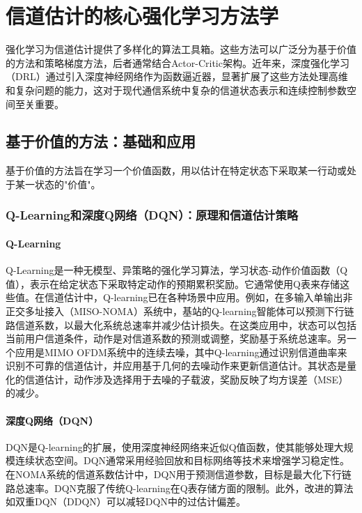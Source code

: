 \documentclass[journal]{IEEEtran}
\begin{document}
\section{信道估计的核心强化学习方法学}

强化学习为信道估计提供了多样化的算法工具箱。这些方法可以广泛分为基于价值的方法和策略梯度方法，后者通常结合Actor-Critic架构。近年来，深度强化学习（DRL）通过引入深度神经网络作为函数逼近器，显著扩展了这些方法处理高维和复杂问题的能力，这对于现代通信系统中复杂的信道状态表示和连续控制参数空间至关重要\cite{ref8}。

\subsection{基于价值的方法：基础和应用}

基于价值的方法旨在学习一个价值函数，用以估计在特定状态下采取某一行动或处于某一状态的"价值"。

\subsubsection{Q-Learning和深度Q网络（DQN）：原理和信道估计策略}

\paragraph{Q-Learning}
Q-Learning是一种无模型、异策略的强化学习算法，学习状态-动作价值函数（Q值），表示在给定状态下采取特定动作的预期累积奖励\cite{ref7}。它通常使用Q表来存储这些值。在信道估计中，Q-learning已在各种场景中应用。例如，在多输入单输出非正交多址接入（MISO-NOMA）系统中，基站的Q-learning智能体可以预测下行链路信道系数，以最大化系统总速率并减少估计损失\cite{ref15}。在这类应用中，状态可以包括当前用户信道条件，动作是对信道系数的预测或调整，奖励基于系统总速率\cite{ref15}。另一个应用是MIMO OFDM系统中的连续去噪，其中Q-learning通过识别信道曲率来识别不可靠的信道估计，并应用基于几何的去噪动作来更新信道估计。其状态是量化的信道估计，动作涉及选择用于去噪的子载波，奖励反映了均方误差（MSE）的减少\cite{ref17}。

\paragraph{深度Q网络（DQN）}
DQN是Q-learning的扩展，使用深度神经网络来近似Q值函数，使其能够处理大规模连续状态空间\cite{ref7}。DQN通常采用经验回放和目标网络等技术来增强学习稳定性。在NOMA系统的信道系数估计中，DQN用于预测信道参数，目标是最大化下行链路总速率\cite{ref18}。DQN克服了传统Q-learning在Q表存储方面的限制\cite{ref18}。此外，改进的算法如双重DQN（DDQN）可以减轻DQN中的过估计偏差\cite{ref19}。
\end{document}
